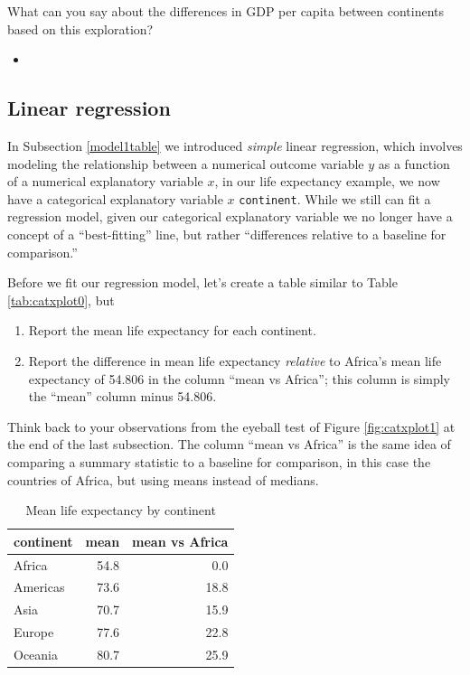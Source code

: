 \documentclass[12pt,]{krantz}
\providecommand{\tightlist}{%
  \setlength{\itemsep}{0pt}\setlength{\parskip}{0pt}}
\newenvironment{rmdblock}[1]
  {\begin{shaded*}
  \begin{itemize}
  \renewcommand{\labelitemi}{
    \raisebox{-.7\height}[0pt][0pt]{
    }
  }
  \item
  }
  {
  \end{itemize}
  \end{shaded*}
  }
\newenvironment{learncheck}
  {\begin{rmdblock}{warning}}
  {\end{rmdblock}}
\theoremstyle{definition}
\theoremstyle{definition}
\theoremstyle{definition}
\theoremstyle{remark}
\begin{document}
What can you say about the differences in GDP per capita between
continents based on this exploration?

\begin{learncheck}

\end{learncheck}

\subsection{Linear regression}\label{model2table}

In Subsection \ref{model1table} we introduced \emph{simple} linear
regression, which involves modeling the relationship between a numerical
outcome variable \(y\) as a function of a numerical explanatory variable
\(x\), in our life expectancy example, we now have a categorical
explanatory variable \(x\) \texttt{continent}. While we still can fit a
regression model, given our categorical explanatory variable we no
longer have a concept of a ``best-fitting'' line, but rather
``differences relative to a baseline for comparison.''

Before we fit our regression model, let's create a table similar to
Table \ref{tab:catxplot0}, but

\begin{enumerate}
\def\labelenumi{\arabic{enumi}.}
\tightlist
\item
  Report the mean life expectancy for each continent.
\item
  Report the difference in mean life expectancy \emph{relative} to
  Africa's mean life expectancy of 54.806 in the column ``mean vs
  Africa''; this column is simply the ``mean'' column minus 54.806.
\end{enumerate}

Think back to your observations from the eyeball test of Figure
\ref{fig:catxplot1} at the end of the last subsection. The column ``mean
vs Africa'' is the same idea of comparing a summary statistic to a
baseline for comparison, in this case the countries of Africa, but using
means instead of medians.

\begin{table}[H]

\caption{\label{tab:continent-mean-life-expectancies}Mean life expectancy by continent}
\centering
\fontsize{10}{12}\selectfont
\begin{tabular}[t]{lrr}
\toprule
continent & mean & mean vs Africa\\
\midrule
Africa & 54.8 & 0.0\\
Americas & 73.6 & 18.8\\
Asia & 70.7 & 15.9\\
Europe & 77.6 & 22.8\\
Oceania & 80.7 & 25.9\\
\bottomrule
\end{tabular}
\end{table}
\end{document}
